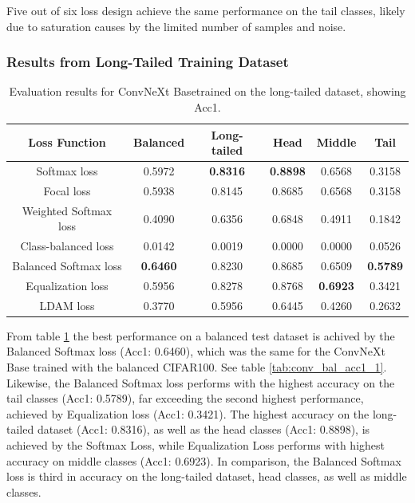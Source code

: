 Five out of six loss design achieve the same performance on the tail classes, likely due to saturation causes by the limited number of samples and noise.


\subsubsection{Results from Long-Tailed Training Dataset}


\begin{table}[h!]
    \centering
    \caption{Evaluation results for ConvNeXt Basetrained on the long-tailed dataset, showing Acc1.}
    \begin{tabular}{cccccc}
        \toprule
        Loss Function & Balanced & Long-tailed & Head & Middle & Tail \\ 
        \midrule
        Softmax loss   & 0.5972 & \textbf{0.8316} & \textbf{0.8898} & 0.6568 & 0.3158 \\
        Focal loss   & 0.5938 & 0.8145 & 0.8685 & 0.6568 & 0.3158 \\
        Weighted Softmax loss   & 0.4090 & 0.6356 & 0.6848 & 0.4911 & 0.1842 \\
        Class-balanced loss   & 0.0142 & 0.0019 & 0.0000 & 0.0000 & 0.0526 \\
        Balanced Softmax loss   & \textbf{0.6460} & 0.8230 & 0.8685 & 0.6509 & \textbf{0.5789} \\
        Equalization loss   & 0.5956 & 0.8278 & 0.8768 & \textbf{0.6923} & 0.3421 \\
        LDAM loss   & 0.3770 & 0.5956 & 0.6445 & 0.4260 & 0.2632 \\
        \bottomrule
    \end{tabular}
    \label{tab:conv_lt_acc1_1}
\end{table}

From table \ref{tab:conv_lt_acc1_1} the best performance on a balanced test dataset is achived by the Balanced Softmax loss (Acc1: 0.6460), which was the same for the ConvNeXt Base trained with the balanced CIFAR100. See table \ref{tab:conv_bal_acc1_1}. Likewise, the Balanced Softmax loss performs with the highest accuracy on the tail classes (Acc1: 0.5789), far exceeding the second highest performance, achieved by Equalization loss (Acc1: 0.3421). The highest accuracy on the long-tailed dataset (Acc1: 0.8316), as well as the head classes (Acc1: 0.8898), is achieved by the Softmax Loss, while Equalization Loss performs with highest accuracy on middle classes (Acc1: 0.6923). In comparison, the Balanced Softmax loss is third in accuracy on the long-tailed dataset, head classes, as well as middle classes. 

